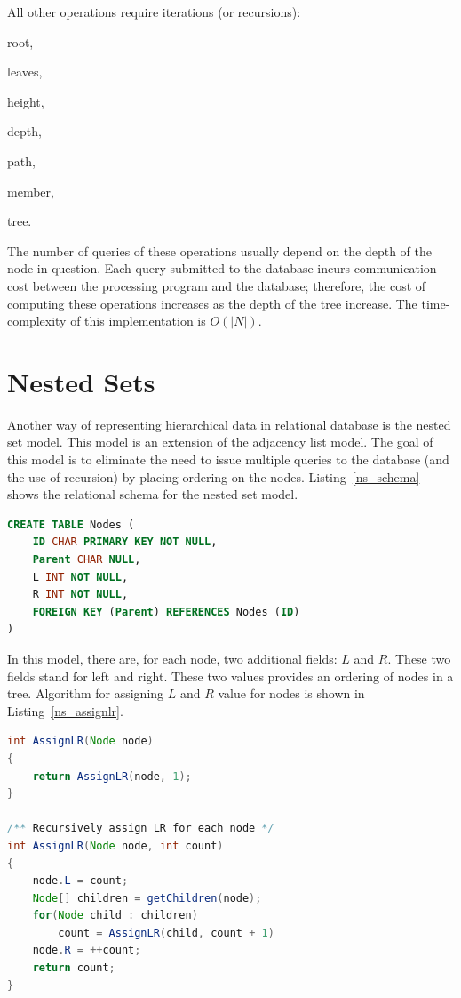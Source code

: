 All other operations require iterations (or recursions): \begin{inparaenum}[\itshape 1)]
\item root,
\item leaves,
\item height,
\item depth,
\item path,
\item member,
\item tree.
\end{inparaenum}
The number of queries of these operations usually depend on the depth of the node in question. Each query submitted to the database incurs communication cost between the processing program and the database; therefore, the cost of computing these operations increases as the depth of the tree increase. The time-complexity of this implementation is $O(|N|)$.


\section{Nested Sets}\label{sec-nested-set}

Another way of representing hierarchical data in relational database is the nested set model\cite{journals/trj/Kamfonas92}. This model is an extension of the adjacency list model. The goal of this model is to eliminate the need to issue multiple queries to the database (and the use of recursion) by placing ordering on the nodes. Listing~\ref{ns_schema} shows the relational schema for the nested set model.

\begin{lstlisting}[language=sql,caption={Nodes table for nested set model},label=ns_schema]
CREATE TABLE Nodes (
    ID CHAR PRIMARY KEY NOT NULL,
    Parent CHAR NULL,
    L INT NOT NULL,
    R INT NOT NULL,
    FOREIGN KEY (Parent) REFERENCES Nodes (ID)
)
\end{lstlisting}	

In this model, there are, for each node, two additional fields: $L$ and $R$. These two fields stand for left and right. These two values provides an ordering of nodes in a tree. Algorithm for assigning $L$ and $R$ value for nodes is shown in Listing~\ref{ns_assignlr}.

\begin{lstlisting}[language=java, style=java, caption={Algorithm for Left-Right value assignment for nested set model},label=ns_assignlr]
int AssignLR(Node node)
{
    return AssignLR(node, 1);
}

/** Recursively assign LR for each node */
int AssignLR(Node node, int count)
{
	node.L = count;
	Node[] children = getChildren(node);
	for(Node child : children)
		count = AssignLR(child, count + 1)
	node.R = ++count;
	return count;
}
\end{lstlisting}


